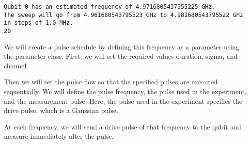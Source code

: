 \begin{Shaded}
\begin{Highlighting}[]
\NormalTok{(}\SpecialCharTok{\{}\OperatorTok{/}\SpecialCharTok{\}}\SpecialCharTok{\{}\OperatorTok{/}\SpecialCharTok{\}}\CharTok{\textbackslash{}}
\SpecialCharTok{\{}\OperatorTok{/}\SpecialCharTok{\}}\NormalTok{)}
\NormalTok{(}
\end{Highlighting}
\end{Shaded}

\begin{verbatim}
Qubit 0 has an estimated frequency of 4.9716805437955225 GHz.
The sweep will go from 4.961680543795523 GHz to 4.981680543795522 GHz in steps of 1.0 MHz.
20
\end{verbatim}

\leavevmode{}%
We will create a pulse schedule by defining this frequency as a
parameter using the parameter class. First, we will set the required
values duration, sigma, and channel.

Then we will set the pulse flow so that the specified pulses are
executed sequentially. We will define the pulse frequency, the pulse
used in the experiment, and the measurement pulse. Here, the pulse used
in the experiment specifies the drive pulse, which is a Gaussian pulse.

At each frequency, we will send a drive pulse of that frequency to the
qubit and measure immediately after the pulse.

\hypertarget{38518258-a0b8-4a6f-817b-38fe07f9f5db}{}
\begin{Shaded}
\begin{Highlighting}[]
     \OperatorTok{+} \NormalTok{ ) }\OperatorTok{{-}}\NormalTok{ (}\OperatorTok{+} \NormalTok{ ) }\OperatorTok{\%} \NormalTok{)}
\end{Highlighting}
\end{Shaded}

\hypertarget{52261d49-5a56-41bb-bc4b-0b0c325b4cc2}{}
\begin{Shaded}
\begin{Highlighting}[]
    \OperatorTok{/}
\end{Highlighting}
\end{Shaded}

